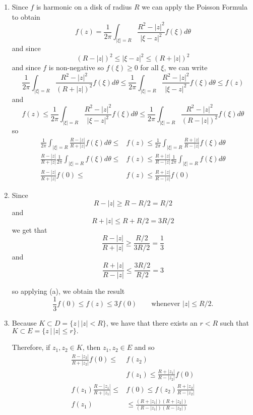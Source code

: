 \documentclass[12pt]{Homework}
\begin{document}
\begin{solution}$\,$
\begin{enumerate}[label=(\alph*)]
    \item Since $f$ is harmonic on a disk of radius $R$ we can apply the Poisson Formula to obtain $$f(z)=\frac{1}{2\pi}\int_{|\xi|=R}\frac{R^2-|z|^2}{|\xi-z|^2}f(\xi)d\theta$$ and since $$(R-|z|)^2\le|\xi-z|^2\le(R+|z|)^2$$ and since $f$ is non-negative so $f(\xi)\ge0$ for all $\xi$, we can write $$ \frac{1}{2\pi}\int_{|\xi|=R}\frac{R^2-|z|^2}{(R+|z|)^2}f(\xi)d\theta\le \frac{1}{2\pi}\int_{|\xi|=R}\frac{R^2-|z|^2}{|\xi-z|^2}f(\xi)d\theta\le f(z)$$ and $$f(z)\le \frac{1}{2\pi}\int_{|\xi|=R}\frac{R^2-|z|^2}{|\xi-z|^2}f(\xi)d\theta\le \frac{1}{2\pi}\int_{|\xi|=R}\frac{R^2-|z|^2}{(R-|z|)^2}f(\xi)d\theta$$ so \begin{align*}
        \frac{1}{2\pi}\int_{|\xi|=R}\frac{R-|z|}{R+|z|}f(\xi)d\theta\le &f(z)\le  \frac{1}{2\pi}\int_{|\xi|=R}\frac{R+|z|}{R-|z|}f(\xi)d\theta\\
        \frac{R-|z|}{R+|z|}\frac{1}{2\pi}\int_{|\xi|=R}f(\xi)d\theta\le &f(z)\le \frac{R+|z|}{R-|z|}\frac{1}{2\pi}\int_{|\xi|=R}f(\xi)d\theta\\
        \frac{R-|z|}{R+|z|}f(0)\le &f(z)\le \frac{R+|z|}{R-|z|} f(0)
    \end{align*}
    \item Since $$R-|z|\ge R-R/2=R/2$$ and $$R+|z|\le R+R/2=3R/2$$ we get that $$\frac{R-|z|}{R+|z|}\ge \frac{R/2}{3R/2}=\frac{1}{3}$$ and $$\frac{R+|z|}{R-|z|}\le \frac{3R/2}{R/2}=3$$
    
    so applying (a), we obtain the result $$\frac{1}{3}f(0)\le f(z)\le 3f(0)\qquad\text{whenever }|z|\le R/2.$$
    \item Because $K\subset D=\{z\,|\,|z|<R\}$, we have that there exists an $r<R$ such that $K\subset E=\{z\,|\,  |z|\le r\}.$
    
    Therefore, if $z_1,z_2\in K$, then $z_1,z_2\in E$ and so \begin{align*}
        \frac{R-|z_2|}{R+|z_2|}f(0)\le & f(z_2)\\
        & f(z_1)\le \frac{R+|z_1|}{R-|z_2|}f(0)\\
       f(z_1)\frac{R-|z_1|}{R+|z_1|} \le &f(0)\le f(z_2)\frac{R+|z_2|}{R-|z_2|}\\
       f(z_1)&\le \frac{(R+|z_1|)(R+|z_2|)}{(R-|z_1|)(R-|z_2|)}
    \end{align*}
\end{enumerate}
\end{solution}
\newpage
\end{document}
